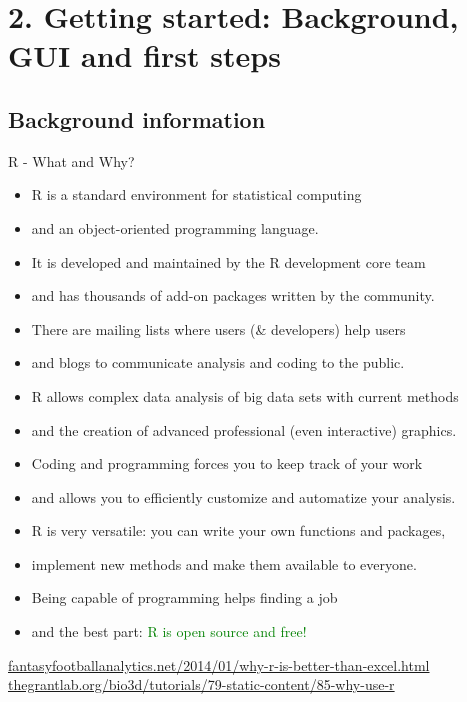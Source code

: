 \documentclass[xcolor=table,       handout,    xcolor=dvipsnames]{beamer}\usepackage[]{graphicx}\usepackage[]{color}
\begin{document}
\section{2. Getting started: Background, GUI and first steps}

\subsection{Background information}

\begin{frame}{R - What and Why?}
\pause
\begin{itemize}%
\item R is a standard environment for statistical computing
\item and an object-oriented programming language.
\item It is developed and maintained by the R development core team
\item and has thousands of add-on packages written by the community.
\item There are mailing lists where users (\& developers) help users
\item and blogs to communicate analysis and coding to the public.
\item R allows complex data analysis of big data sets with current methods
\item and the creation of advanced professional (even interactive) graphics.
\item Coding and programming forces you to keep track of your work
\item and allows you to efficiently customize and automatize your analysis.
\item R is very versatile: you can write your own functions and packages,
\item implement new methods and make them available to everyone.
\item Being capable of programming helps finding a job
\item and the best part: \textcolor{green}{R is open source and free!}
\end{itemize}
\pause
\small \href{http://fantasyfootballanalytics.net/2014/01/why-r-is-better-than-excel.html}{fantasyfootballanalytics.net/2014/01/why-r-is-better-than-excel.html}
\href{http://thegrantlab.org/bio3d/tutorials/79-static-content/85-why-use-r}{thegrantlab.org/bio3d/tutorials/79-static-content/85-why-use-r}
\end{frame}
\end{document}
